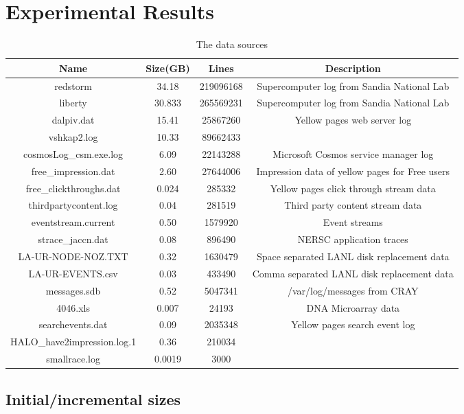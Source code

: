 \section{Experimental Results}
\begin{table*}[h]
\centering
\caption{The data sources}
\begin{tabular}{|c|c|c|c|} \hline
Name 	& Size(GB) & Lines & Description \\ \hline
redstorm & 34.18 & 219096168 & Supercomputer log from Sandia National Lab	\\ \hline
liberty & 30.833 & 265569231 &	Supercomputer log from Sandia National Lab\\ \hline
dalpiv.dat & 15.41 & 25867260 &	Yellow pages web server log \\ \hline
vshkap2.log & 10.33 & 89662433	\\ \hline
cosmosLog\_csm.exe.log & 6.09 & 22143288 & Microsoft Cosmos service manager log\\ \hline
free\_impression.dat & 2.60 & 27644006 & Impression data of yellow pages for Free users\\ \hline
free\_clickthroughs.dat & 0.024 & 285332 & Yellow pages click through stream data \\ \hline
thirdpartycontent.log & 0.04 & 281519 &	Third party content stream data \\ \hline
eventstream.current & 0.50 & 1579920 &	Event streams \\ \hline
strace\_jaccn.dat & 0.08 & 896490 & NERSC application traces \\ \hline
LA-UR-NODE-NOZ.TXT & 0.32 &  1630479 & Space separated LANL disk replacement data\\ \hline
LA-UR-EVENTS.csv & 0.03 &  433490 & Comma separated LANL disk replacement data\\ \hline
messages.sdb & 0.52 & 5047341 &	/var/log/messages from CRAY\\ \hline
4046.xls & 0.007 & 24193 & DNA Microarray data\\ \hline
searchevents.dat & 0.09 & 2035348 & Yellow pages search event log \\ \hline
HALO\_have2impression.log.1 & 0.36 &  210034 & 	\\ \hline
smallrace.log & 0.0019 & 3000 &	\\ \hline
\end{tabular}
\end{table*}

\subsection{Initial/incremental sizes}

